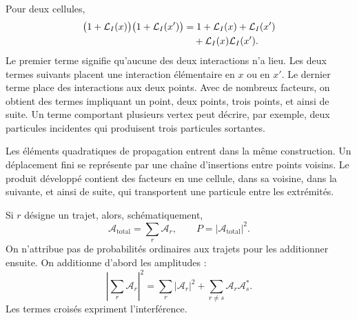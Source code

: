 Pour deux cellules,
\begin{align}
\bigl(1+\mathcal L_I(x)\bigr)
\bigl(1+\mathcal L_I(x')\bigr)
&=
1+\mathcal L_I(x)+\mathcal L_I(x')
\notag\\
&\quad{}+\mathcal L_I(x)\mathcal L_I(x').
\end{align}
Le premier terme signifie qu’aucune des deux interactions n’a lieu. Les deux termes suivants placent une interaction élémentaire en \(x\) ou en \(x'\). Le dernier terme place des interactions aux deux points. Avec de nombreux facteurs, on obtient des termes impliquant un point, deux points, trois points, et ainsi de suite. Un terme comportant plusieurs vertex peut décrire, par exemple, deux particules incidentes qui produisent trois particules sortantes.

Les éléments quadratiques de propagation entrent dans la même construction. Un déplacement fini se représente par une chaîne d’insertions entre points voisins. Le produit développé contient des facteurs en une cellule, dans sa voisine, dans la suivante, et ainsi de suite, qui transportent une particule entre les extrémités.

\begin{classroomqa}
\end{classroomqa}

Si \(r\) désigne un trajet, alors, schématiquement,
\begin{equation}
\mathcal A_{\mathrm{total}}=\sum_r\mathcal A_r,
\qquad
P=\left|\mathcal A_{\mathrm{total}}\right|^2.
\end{equation}
On n’attribue pas de probabilités ordinaires aux trajets pour les additionner ensuite. On additionne d’abord les amplitudes :
\begin{equation}
\left|\sum_r\mathcal A_r\right|^2
=
\sum_r|\mathcal A_r|^2
+
\sum_{r\ne s}\mathcal A_r\mathcal A_s^*.
\end{equation}
Les termes croisés expriment l’interférence.

\begin{classroomqa}
\end{classroomqa}


